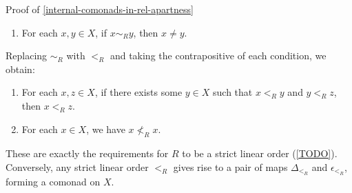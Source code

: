 \begin{Proof}{Proof of \cref{internal-comonads-in-rel-apartness}}
\begin{enumerate}
        \item\label{proof-of-internal-comonads-in-rel-apartness-2}For each $x,y\in X$, if $x\sim_{R}y$, then $x\neq y$.
    \end{enumerate}
    Replacing $\sim_{R}$ with $<_{R}$ and taking the contrapositive of each condition, we obtain:
    \begin{enumerate}
        \item\label{proof-of-internal-comonads-in-rel-apartness-3}For each $x,z\in X$, if there exists some $y\in X$ such that $x<_{R}y$ and $y<_{R}z$, then $x<_{R}z$.
        \item\label{proof-of-internal-comonads-in-rel-apartness-4}For each $x\in X$, we have $x\nless_{R}x$.
    \end{enumerate}
    These are exactly the requirements for $R$ to be a strict linear order (\cref{TODO}). Conversely, any strict linear order $<_{R}$ gives rise to a pair of maps $\Delta_{<_{R}}$ and $\epsilon_{<_{R}}$, forming a comonad on $X$.
\end{Proof}
